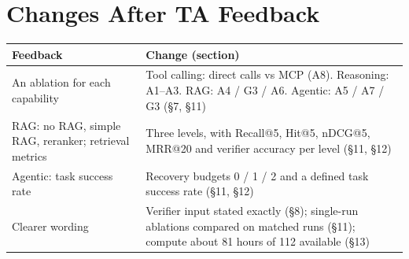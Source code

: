 \documentclass[11pt,a4paper]{article}
\begin{document}
\section{Changes After TA Feedback}
{\small
\begin{tabularx}{\linewidth}{@{}p{4.1cm}L@{}}
\toprule
\textbf{Feedback} & \textbf{Change (section)}\\
\midrule
An ablation for each capability & Tool calling: direct calls vs MCP (A8). Reasoning: A1--A3. RAG: A4 / G3 / A6. Agentic: A5 / A7 / G3 (\S7, \S11) \\
RAG: no RAG, simple RAG, reranker; retrieval metrics & Three levels, with Recall@5, Hit@5, nDCG@5, MRR@20 and verifier accuracy per level (\S11, \S12) \\
Agentic: task success rate & Recovery budgets 0 / 1 / 2 and a defined task success rate (\S11, \S12) \\
Clearer wording & Verifier input stated exactly (\S8); single-run ablations compared on matched runs (\S11); compute about 81 hours of 112 available (\S13) \\
\bottomrule
\end{tabularx}}
\end{document}
